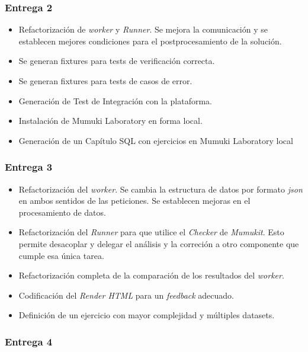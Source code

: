\subsubsection{Entrega 2}

\begin{itemize}
    \item Refactorización de \textit{worker} y \textit{Runner}.
    Se mejora la comunicación y se establecen mejores condiciones para el
    postprocesamiento de la solución.
    \item Se generan fixtures para tests de verificación correcta.
    \item Se generan fixtures para tests de casos de error.
    \item Generación de Test de Integración con la plataforma.
    \item Instalación de Mumuki Laboratory en forma local.
    \item Generación de un Capítulo SQL con ejercicios en Mumuki Laboratory local
\end{itemize}

\subsubsection{Entrega 3}

\begin{itemize}
    \item Refactorización del \textit{worker}.
    Se cambia la estructura de datos por formato \textit{json} en ambos sentidos
    de las peticiones.
    Se establecen mejoras en el procesamiento de datos.
    \item Refactorización del \textit{Runner} para que utilice el \textit{Checker}
    de \textit{Mumukit}. Esto permite desacoplar y delegar el análisis
    y la correción a otro componente que cumple esa única tarea.
    \item Refactorización completa de la comparación de los resultados del \textit{worker}.
    \item Codificación del \textit{Render HTML} para un \textit{feedback} adecuado.
    \item Definición de un ejercicio con mayor complejidad y múltiples datasets.
\end{itemize}

\subsubsection{Entrega 4}

